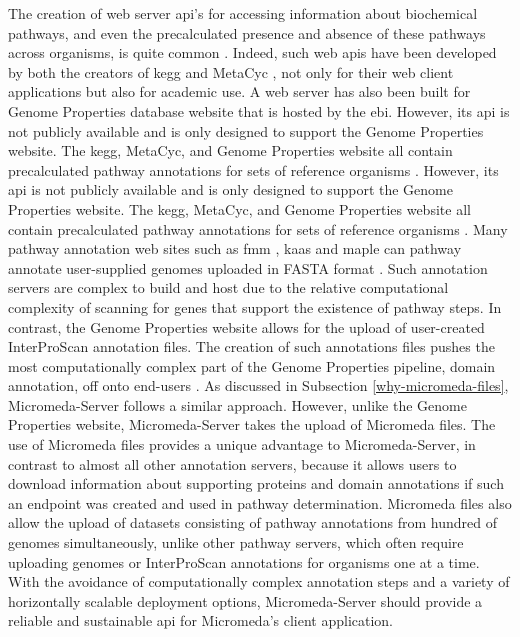 The creation of web server \gls{api}'s for accessing information about 
biochemical pathways, and even the precalculated presence and absence of these 
pathways across organisms, is quite common 
\cite{wu2006kobas,moriya2010pathpred,pireddu2006path,vallenet2009microscope,aziz2008rast,takami2016automated,moriya2007kaas,chou2009fmm}. 
Indeed, such web \gls{api}s have been developed by both the creators of 
\gls{kegg} \cite{kawashima2003kegg} and MetaCyc \cite{karp2013data}, not only 
for their web client applications but also for academic use. A web server has 
also been built for Genome Properties database website 
\cite{richardson2018genome} that is hosted by the \gls{ebi}. However, its 
\gls{api} is not publicly available and is only designed to support the Genome 
Properties website. The \gls{kegg}, MetaCyc, and Genome Properties website all 
contain precalculated pathway annotations for sets of reference organisms 
\cite{kanehisa2000kegg,karp2002metacyc,karp2013data}. However, its \gls{api} is 
not publicly available and is only designed to support the Genome Properties 
website. The \gls{kegg}, MetaCyc, and Genome Properties website all contain 
precalculated pathway annotations for sets of reference organisms 
\cite{kanehisa2000kegg,karp2002metacyc,karp2013data}. Many pathway annotation 
web sites such as \gls{fmm} \cite{chou2009fmm}, \gls{kaas} \cite{moriya2007kaas} 
and \gls{maple} \cite{takami2016automated} can pathway annotate user-supplied 
genomes uploaded in FASTA format \cite{pearson19905}. Such annotation servers 
are complex to build and host due to the relative computational complexity of 
scanning for genes that support the existence of pathway steps. In contrast, the 
Genome Properties website allows for the upload of user-created InterProScan 
annotation files. The creation of such annotations files pushes the most 
computationally complex part of the Genome Properties pipeline, domain 
annotation, off onto end-users \cite{richardson2018genome}. As discussed in 
Subsection \ref{why-micromeda-files}, Micromeda-Server follows a similar 
approach. However, unlike the Genome Properties website, Micromeda-Server takes 
the upload of Micromeda files. The use of Micromeda files provides a unique 
advantage to Micromeda-Server, in contrast to almost all other annotation 
servers, because it allows users to download information about supporting 
proteins and domain annotations if such an endpoint was created and used in 
pathway determination. Micromeda files also allow the upload of datasets 
consisting of pathway annotations from hundred of genomes simultaneously, unlike 
other pathway servers, which often require uploading genomes or InterProScan 
annotations for organisms one at a time. With the avoidance of computationally 
complex annotation steps and a variety of horizontally scalable deployment 
options, Micromeda-Server should provide a reliable and sustainable \gls{api} 
for Micromeda's client application.
